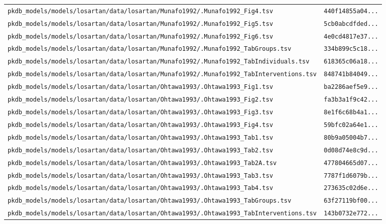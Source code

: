 \begin{longtable}{ll}
\texttt{pkdb\_models/models/losartan/data/losartan/Munafo1992/.Munafo1992\_Fig4.tsv} & \texttt{440f14855a04...} \\
\texttt{pkdb\_models/models/losartan/data/losartan/Munafo1992/.Munafo1992\_Fig5.tsv} & \texttt{5cb0abcdfded...} \\
\texttt{pkdb\_models/models/losartan/data/losartan/Munafo1992/.Munafo1992\_Fig6.tsv} & \texttt{4e0cd4817e37...} \\
\texttt{pkdb\_models/models/losartan/data/losartan/Munafo1992/.Munafo1992\_TabGroups.tsv} & \texttt{334b899c5c18...} \\
\texttt{pkdb\_models/models/losartan/data/losartan/Munafo1992/.Munafo1992\_TabIndividuals.tsv} & \texttt{618365c06a18...} \\
\texttt{pkdb\_models/models/losartan/data/losartan/Munafo1992/.Munafo1992\_TabInterventions.tsv} & \texttt{848741b84049...} \\
\texttt{pkdb\_models/models/losartan/data/losartan/Ohtawa1993/.Ohtawa1993\_Fig1.tsv} & \texttt{ba2286aef5e9...} \\
\texttt{pkdb\_models/models/losartan/data/losartan/Ohtawa1993/.Ohtawa1993\_Fig2.tsv} & \texttt{fa3b3a1f9c42...} \\
\texttt{pkdb\_models/models/losartan/data/losartan/Ohtawa1993/.Ohtawa1993\_Fig3.tsv} & \texttt{8e1f6c68b4a1...} \\
\texttt{pkdb\_models/models/losartan/data/losartan/Ohtawa1993/.Ohtawa1993\_Fig4.tsv} & \texttt{59bfc02a64e1...} \\
\texttt{pkdb\_models/models/losartan/data/losartan/Ohtawa1993/.Ohtawa1993\_Tab1.tsv} & \texttt{80b9a05004b7...} \\
\texttt{pkdb\_models/models/losartan/data/losartan/Ohtawa1993/.Ohtawa1993\_Tab2.tsv} & \texttt{0d08d74e8c9d...} \\
\texttt{pkdb\_models/models/losartan/data/losartan/Ohtawa1993/.Ohtawa1993\_Tab2A.tsv} & \texttt{477804665d07...} \\
\texttt{pkdb\_models/models/losartan/data/losartan/Ohtawa1993/.Ohtawa1993\_Tab3.tsv} & \texttt{7787f1d6079b...} \\
\texttt{pkdb\_models/models/losartan/data/losartan/Ohtawa1993/.Ohtawa1993\_Tab4.tsv} & \texttt{273635c02d6e...} \\
\texttt{pkdb\_models/models/losartan/data/losartan/Ohtawa1993/.Ohtawa1993\_TabGroups.tsv} & \texttt{63f27119bf00...} \\
\texttt{pkdb\_models/models/losartan/data/losartan/Ohtawa1993/.Ohtawa1993\_TabInterventions.tsv} & \texttt{143b0732e772...} \\

\end{longtable}
